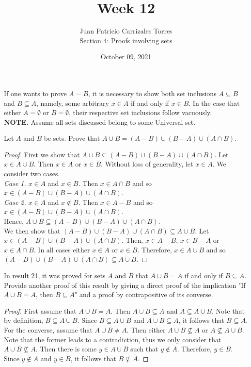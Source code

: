 \documentclass[12pt]{article}
\newenvironment{problem}[2][Problem]{\begin{trivlist}
		\item[\hskip \labelsep {\bfseries #1}\hskip \labelsep {\bfseries #2.}]}{\end{trivlist}}
\begin{document}
	
	\title{Week 12}
	\author{Juan Patricio Carrizales Torres \\
		Section 4: Proofs involving sets}
	\date{October 09, 2021}
	\maketitle
	 
	If one wants to prove $A=B$, it is necessary to show both set inclusions $A\subseteq B$ and $B\subseteq A$, namely, some arbitrary $x\in A$ if and only if $x\in B$. In the case that either $A=\emptyset$ or $B=\emptyset$, their respective set inclusions follow vacuously.\\
	\textbf{NOTE.} Assume all sets discussed belong to some Universal set.
	
	\begin{problem}{40}
		Let $A$ and $B$ be sets. Prove that $A\cup B = (A-B)\cup(B-A)\cup(A\cap B)$.
		\begin{proof}
			 First we show that $A\cup B \subseteq (A-B)\cup(B-A)\cup(A\cap B)$. Let $x\in A\cup B$. Then $x\in A$ or $x\in B$. Without loss of generality, let $x\in A$. We consider two cases.\\
			 \textit{Case 1.} $x\in A$ and $x\in B$. Then $x\in A\cap B$ and so $x\in (A-B)\cup(B-A)\cup(A\cap B)$.\\
			 \textit{Case 2.} $x\in A$ and $x\not\in B$. Then $x\in A-B$ and so $x\in (A-B)\cup(B-A)\cup(A\cap B)$.\\
			  Hence, $A\cup B \subseteq (A-B)\cup(B-A)\cup(A\cap B)$.\\
			  
			 We then show that $(A-B)\cup(B-A)\cup(A\cap B) \subseteq A\cup B$. Let $x\in (A-B)\cup(B-A)\cup(A\cap B)$. Then, $x\in A-B$, $x\in B-A$ or $x\in A\cap B$. In all cases either $x\in A$ or $x\in B$. Therefore, $x\in A\cup B$ and so $(A-B)\cup(B-A)\cup(A\cap B) \subseteq A\cup B$.
		\end{proof}
	\end{problem}

	\begin{problem}{41}
		In result 21, it was proved for sets $A$ and $B$ that $A\cup B = A$ if and only if $B\subseteq A$. Provide another proof of this result by giving a direct proof of the implication "If $A\cup B = A$, then $B\subseteq A$" and a proof by contrapositive of its converse.
		\begin{proof}
			First assume that $A\cup B = A$. Then $A\cup B \subseteq A$ and $A \subseteq A\cup B$. Note that by definition, $B \subseteq A\cup B$. Since $B \subseteq A\cup B$ and $A\cup B \subseteq A$, it follows that $B\subseteq A$.\\
			
			For the converse, assume that $A\cup B \neq A$. Then either $A\cup B \not\subseteq A$ or $A\not\subseteq A\cup B$. Note that the former leads to a contradiction, thus we only consider that $A\cup B \not\subseteq A$. Then there is some $y\in A\cup B$ such that $y\not\in A$. Therefore, $y\in B$. Since $y\not\in A$ and $y\in B$, it follows that $B\not\subseteq A$. 
		\end{proof}
	\end{problem}
\end{document}

